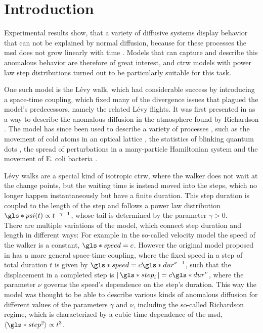 \chapter{Introduction}

Experimental results show, that a variety of diffusive systems display behavior that can not be explained by normal diffusion, because for these processes the \gls*{msd} does not grow linearly with time
\cite{xu2011,sagi2012,marty2005,amblard1996}
. 
Models that can capture and describe this anomalous behavior are therefore of great interest, and \gls*{ctrw} models with power law step distributions turned out to be particularly suitable for this task.

One such model is the L\'evy walk, which had considerable success by introducing a space-time coupling, which fixed many of the divergence issues that plagued the model's predecessors, namely the related L\'evy flights. It was first presented in 
\cite{shlesinger1987} 
as a way to describe the anomalous diffusion in the atmosphere found by Richardson 
\cite{richardson}. 
The model has since been used to describe a variety of processes 
\cite{lwreview} ,
such as the movement of cold atoms in an optical lattice 
\cite{marksteiner1996}, 
the statistics of blinking quantum dots 
\cite{jung2002}, 
the spread of perturbations in a many-particle Hamiltonian system 
\cite{zaburdaev2011perturbation} 
and the movement of E. coli bacteria 
\cite{korobkova2004}.

L\'evy walks are a special kind of isotropic \gls*{ctrw}, where the walker does not wait at the change points, but the waiting time is instead moved into the steps, which no longer happen instantaneously but have a finite duration. This step duration is coupled to the length of the step and follows a power law distribution $\gls*{psi}(t) \propto t^{-\gamma-1}$, whose tail is determined by the parameter $\gamma>0$. \\
There are multiple variations of the model, which connect step duration and length in different ways: For example in the so-called velocity model the speed of the walker is a constant, $\gls*{speed} = c$. However the original model proposed in 
\cite{shlesinger1987}
has a more general space-time coupling, where the fixed speed in a step of total duration $t$ is given by $\gls*{speed} = c  \gls*{dur}^{\nu-1}$, such that the displacement in a completed step is $\abs{\gls*{step}_i} = c \gls*{dur}^{\nu}$, where the parameter $\nu$ governs the speed's dependence on the step's duration. This way the model was thought to be able to describe various kinds of anomalous diffusion for different values of the parameters $\gamma$ and $\nu$, including the so-called Richardson regime, which is characterized by a cubic time dependence of the \gls*{msd}, $\mean{\gls*{step}^2} \propto t^3$. 

